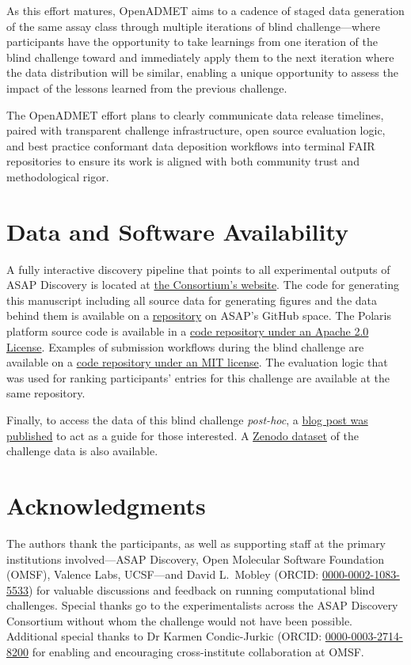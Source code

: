 \documentclass[journal=jcim,manuscript=article]{achemso}
\begin{document}
As this effort matures, OpenADMET aims to a cadence of staged data generation of the same assay class through multiple iterations of blind challenge---where participants have the opportunity to take learnings from one iteration of the blind challenge toward and immediately apply them to the next iteration where the data distribution will be similar, enabling a unique opportunity to assess the impact of the lessons learned from the previous challenge. 

The OpenADMET effort plans to clearly communicate data release timelines, paired with transparent challenge infrastructure, open source evaluation logic, and best practice conformant data deposition workflows into terminal FAIR repositories to ensure its work is aligned with both community trust and methodological rigor.

\section{Data and Software Availability}
A fully interactive discovery pipeline that points to all experimental outputs of ASAP Discovery is located at \href{https://asapdiscovery.org/pipeline/}{the Consortium's website}. The code for generating this manuscript including all source data for generating figures and the data behind them is available on a \href{https://github.com/asapdiscovery/asap-blind-challenge-paper}{repository} on ASAP's GitHub space. The Polaris platform source code is available in a \href{https://github.com/polaris-hub/polaris}{code repository under an Apache 2.0 License}. Examples of submission workflows during the blind challenge are available on a \href{https://github.com/asapdiscovery/asap-polaris-blind-challenge-examples}{code repository under an MIT license}. The evaluation logic that was used for ranking participants' entries for this challenge are available at the same repository. 

Finally, to access the data of this blind challenge \textit{post-hoc}, a \href{https://blog.omsf.io/how-to-access-the-asap-discovery-x-polarishub-x-openadmet-challenge-data/}{blog post was published} to act as a guide for those interested. A \href{https://zenodo.org/records/15582067}{Zenodo dataset} of the  challenge data is also available.

\section{Acknowledgments}

The authors thank the participants, as well as supporting staff at the primary institutions involved---ASAP Discovery, Open Molecular Software Foundation (OMSF), Valence Labs, UCSF---and David L.\ Mobley (ORCID: \href{https://orcid.org/0000-0002-1083-5533}{0000-0002-1083-5533}) for valuable discussions and feedback on running computational blind challenges. Special thanks go to the experimentalists across the ASAP Discovery Consortium without whom the challenge would not have been possible. Additional special thanks to Dr Karmen Condic-Jurkic (ORCID: \href{https://orcid.org/0000-0003-2714-8200}{0000-0003-2714-8200} for enabling and encouraging cross-institute collaboration at OMSF.
\end{document}
